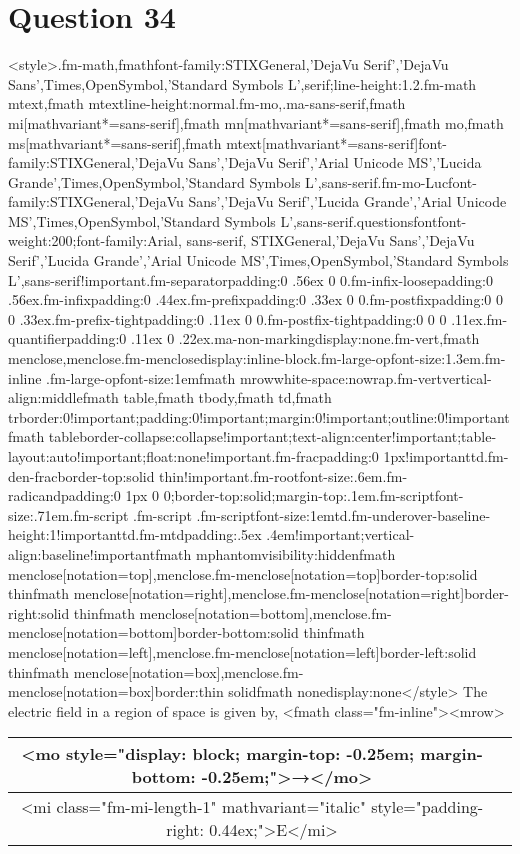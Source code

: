 \documentclass{article}
\begin{document}
\section*{Question 34}
<style>.fm-math,fmath{font-family:STIXGeneral,'DejaVu Serif','DejaVu Sans',Times,OpenSymbol,'Standard Symbols L',serif;line-height:1.2}.fm-math mtext,fmath mtext{line-height:normal}.fm-mo,.ma-sans-serif,fmath mi[mathvariant*=sans-serif],fmath mn[mathvariant*=sans-serif],fmath mo,fmath ms[mathvariant*=sans-serif],fmath mtext[mathvariant*=sans-serif]{font-family:STIXGeneral,'DejaVu Sans','DejaVu Serif','Arial Unicode MS','Lucida Grande',Times,OpenSymbol,'Standard Symbols L',sans-serif}.fm-mo-Luc{font-family:STIXGeneral,'DejaVu Sans','DejaVu Serif','Lucida Grande','Arial Unicode MS',Times,OpenSymbol,'Standard Symbols L',sans-serif}.questionsfont{font-weight:200;font-family:Arial, sans-serif, STIXGeneral,'DejaVu Sans','DejaVu Serif','Lucida Grande','Arial Unicode MS',Times,OpenSymbol,'Standard Symbols L',sans-serif!important}.fm-separator{padding:0 .56ex 0 0}.fm-infix-loose{padding:0 .56ex}.fm-infix{padding:0 .44ex}.fm-prefix{padding:0 .33ex 0 0}.fm-postfix{padding:0 0 0 .33ex}.fm-prefix-tight{padding:0 .11ex 0 0}.fm-postfix-tight{padding:0 0 0 .11ex}.fm-quantifier{padding:0 .11ex 0 .22ex}.ma-non-marking{display:none}.fm-vert,fmath menclose,menclose.fm-menclose{display:inline-block}.fm-large-op{font-size:1.3em}.fm-inline .fm-large-op{font-size:1em}fmath mrow{white-space:nowrap}.fm-vert{vertical-align:middle}fmath table,fmath tbody,fmath td,fmath tr{border:0!important;padding:0!important;margin:0!important;outline:0!important}fmath table{border-collapse:collapse!important;text-align:center!important;table-layout:auto!important;float:none!important}.fm-frac{padding:0 1px!important}td.fm-den-frac{border-top:solid thin!important}.fm-root{font-size:.6em}.fm-radicand{padding:0 1px 0 0;border-top:solid;margin-top:.1em}.fm-script{font-size:.71em}.fm-script .fm-script .fm-script{font-size:1em}td.fm-underover-base{line-height:1!important}td.fm-mtd{padding:.5ex .4em!important;vertical-align:baseline!important}fmath mphantom{visibility:hidden}fmath menclose[notation=top],menclose.fm-menclose[notation=top]{border-top:solid thin}fmath menclose[notation=right],menclose.fm-menclose[notation=right]{border-right:solid thin}fmath menclose[notation=bottom],menclose.fm-menclose[notation=bottom]{border-bottom:solid thin}fmath menclose[notation=left],menclose.fm-menclose[notation=left]{border-left:solid thin}fmath menclose[notation=box],menclose.fm-menclose[notation=box]{border:thin solid}fmath none{display:none}</style> The electric field in a region of space is given by, <fmath class="fm-inline"><mrow>\begin{tabular}{|c|c|}
\hline
<mo style="display: block; margin-top: -0.25em; margin-bottom: -0.25em;">→</mo> \\
\hline
<mi class="fm-mi-length-1" mathvariant="italic" style="padding-right: 0.44ex;">E</mi> \\
\hline
\end{tabular}
\end{document}
